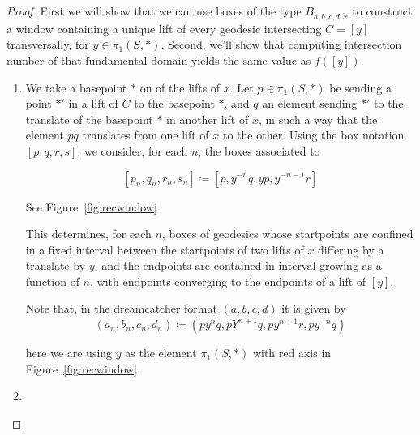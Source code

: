 \begin{proof}
First we will show that we can use boxes of the type $B_{a,b,c,d,\tilde{x}}$ to construct a window containing a unique lift of every geodesic intersecting $C=[y]$ transversally, for $y \in \pi_1(S,*)$.
Second, we'll show that computing intersection number of that fundamental domain yields the same value as $f([y])$.
\begin{enumerate}
\item We take a basepoint $*$ on of the lifts of $x$.
  Let $p \in \pi_1(S,*)$ be sending a point $*'$ in a lift of $C$ to the basepoint $*$, and $q$ an element sending $*'$ to the translate of the basepoint $*$ in another lift of $x$, in such a way that the element $pq$ translates from one lift of $x$ to the other.
    Using the box notation $[p,q,r,s]$, we consider, for each $n$, the boxes associated to
    
    \[
      [p_n,q_n,r_n,s_n] \coloneqq [p,y^{-n}q,yp,y^{-n-1}r]
    \]
    
    See Figure~\ref{fig:recwindow}.
    
           \begin{figure}
\end{figure}
    
    This determines, for each $n$, boxes of geodesics whose startpoints are confined in a fixed interval between the startpoints of two lifts of $x$ differing by a translate by $y$, and the endpoints are contained in interval growing as a function of $n$, with endpoints converging to the endpoints of a lift of $[y]$.
    
    Note that, in the dreamcatcher format $(a,b,c,d)$ it is given by
    \[
      (a_n,b_n,c_n,d_n) \coloneqq (py^nq, pY^{n+1}q,py^{n+1}r,py^{-n}q)
    \]
    
    here we are using $y$ as the element $\pi_1(S,*)$ with red axis in Figure~\ref{fig:recwindow}.
    \item 

\end{enumerate}
\end{proof}
